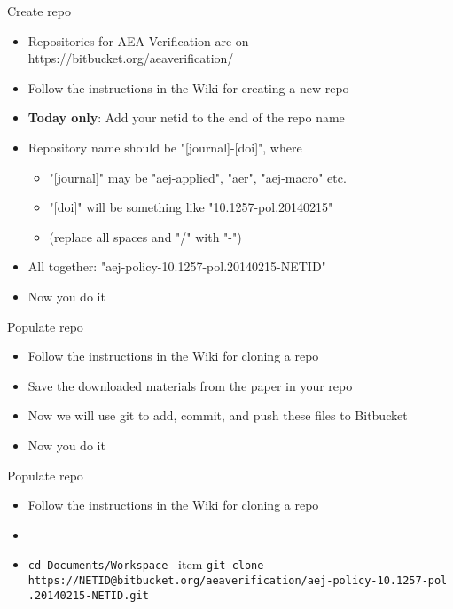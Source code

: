 \documentclass[xcolor={dvipsnames}]{beamer}
\theoremstyle{definition}
\begin{document}
\begin{frame}{Create repo}
\begin{itemize}
    \item Repositories for AEA Verification are on https://bitbucket.org/aeaverification/
    \item Follow the instructions in the Wiki for creating a new repo
    \item \textbf{Today only}: Add your netid to the end of the repo name
    \item Repository name should be "[journal]-[doi]", where
    \begin{itemize}
        \item "[journal]" may be "aej-applied", "aer", "aej-macro" etc.
        \item "[doi]" will be something like "10.1257-pol.20140215"
        \item (replace all spaces and "/" with "-")
    \end{itemize}
    \item All together: "aej-policy-10.1257-pol.20140215-NETID"
    \pause
    \item Now you do it
\end{itemize}
\end{frame}

\begin{frame}{Populate repo}
\begin{itemize}
    \item Follow the instructions in the Wiki for cloning a repo
    \item Save the downloaded materials from the paper in your repo
    \item Now we will use git to add, commit, and push these files to Bitbucket
    \pause
    \item Now you do it
\end{itemize}
\end{frame}


\begin{frame}{Populate repo}
\begin{itemize}
	\item Follow the instructions in the Wiki for cloning a repo
	\item[]
	\item \texttt{cd Documents/Workspace }
	item \texttt{git clone https://NETID@bitbucket.org/aeaverification/aej-policy-10.1257-pol
		.20140215-NETID.git} 
\end{itemize}
\end{frame}
\end{document}
